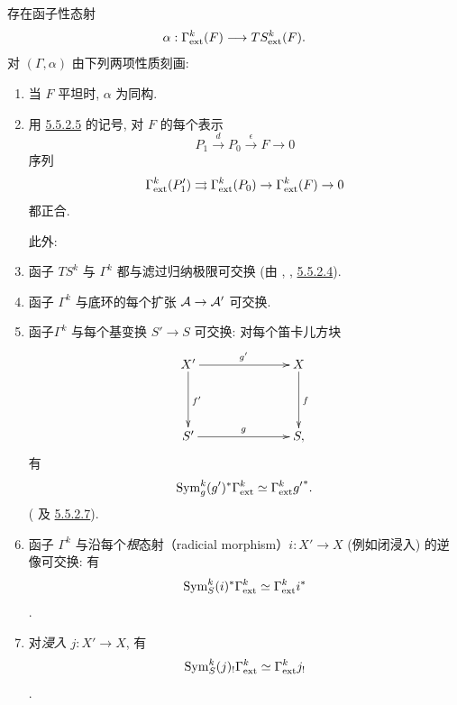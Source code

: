 \subsubsection{}
存在函子性态射
$$
\alpha:\Gamma^k_{\operatorname{ext}}(F)\longrightarrow TS^k_{\operatorname{ext}}(F){}.
$$
对 $(\Gamma,\alpha)$ 由下列两项性质刻画:
\begin{enumerate}
\renewcommand{\theenumi}{\roman{enumi}}
\renewcommand{\labelenumi}{(\theenumi)}
\item 当 $F$ 平坦时, $\alpha$ 为同构.

\item 用 \hyperref[XVII.par5.5.2.5]{5.5.2.5} 的记号, 对 $F$ 的每个表示
$$
P_1\xrightarrow{d}P_0\xrightarrow{\epsilon}F\longrightarrow0
$$
序列
$$
\Gamma^k_{\operatorname{ext}}(P'_1)\rightrightarrows
\Gamma^k_{\operatorname{ext}}(P_0)\rightarrow\Gamma^k_{\operatorname{ext}}(F)\rightarrow0
$$
都正合.

此外:

\item 函子 $TS^k$ 与 $\Gamma^k$ 都与滤过归纳极限可交换 (由 , , \hyperref[XVII.par5.5.2.4]{5.5.2.4}).

\item 函子 $\Gamma^k$ 与底环的每个扩张 ${\mathcal A}\rightarrow{\mathcal A}'$ 可交换.

\item 函子\pageoriginale $\Gamma^k$ 与每个基变换 $S'\rightarrow S$ 可交换: 对每个笛卡儿方块
$$
\xymatrix@C=2.5cm@R=1.5cm{
X' \ar[r]^{g'}\ar[d]^{f'}& X \ar[d]^{f}\\
S' \ar[r]^{g}& S,
}
$$
有
$$
\operatorname{Sym}^k_g(g')^{\ast}\Gamma^k_{\operatorname{ext}}\simeq
\Gamma^k_{\operatorname{ext}}{g'}^{\ast}{}.
$$
( 及 \hyperref[XVII.par5.5.2.7]{5.5.2.7}).

\item 函子 $\Gamma^k$ 与沿每个\emph{根}态射（radicial morphism）$i:X'\rightarrow X$ (例如闭浸入) 的逆像可交换: 有
$$
\operatorname{Sym}^k_S(i)^{\ast}\Gamma^k_{\operatorname{ext}}\simeq
\Gamma^k_{\operatorname{ext}}i^{\ast}
$$
.

\item 对\emph{浸入} $j:X'\rightarrow X$, 有
$$
\operatorname{Sym}^k_S(j)_{!}\Gamma^k_{\operatorname{ext}}\simeq\Gamma^k_{\operatorname{ext}}j_{!}
$$
.
\end{enumerate}

\subsubsection{}

